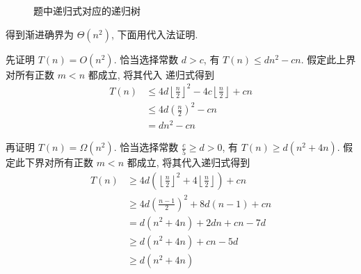 \documentclass[boxes]{homework}
\begin{document}
\begin{solution}
\begin{figure}[ht]
        \caption{题中递归式对应的递归树}
        \label{fig:recursion-tree-4.4-7}
    \end{figure}
    得到渐进确界为 $\Theta \left( n^{2}\right)$, 下面用代入法证明.

    先证明 $T(n) = O \left( n^{2}\right)$. 恰当选择常数 $d > c$, 有
    $T(n) \leqslant dn^{2} - cn$. 假定此上界对所有正数 $m < n$ 都成立, 将其代入
    递归式得到
    \begin{equation}
        \begin{aligned}
            T(n)
             & \leqslant 4 d{\left\lfloor \frac{ n }{ 2 }\right\rfloor}^{2} -
            4c \left\lfloor \frac{ n }{ 2 }\right\rfloor + cn                 \\
             & \leqslant 4 d{\left( \frac{ n }{ 2 }\right)}^{2} - cn          \\
             & = dn^{2} - cn
        \end{aligned}
    \end{equation}

    再证明 $T(n) = \Omega \left( n^{2}\right)$. 恰当选择常数
    $\frac{ c }{ 5 } \geqslant d > 0$, 有
    $T(n) \geqslant d \left( n^{2} + 4n\right)$. 假定此下界对所有正数 $m < n$
    都成立, 将其代入递归式得到
    \begin{equation}
        \begin{aligned}
            T(n)
             & \geqslant 4d \left(
            {\left\lfloor \frac{ n }{ 2 }\right\rfloor}^{2} +
            4 \left\lfloor \frac{ n }{ 2 }\right\rfloor \right) + cn  \\
             & \geqslant 4d {\left( \frac{ n - 1 }{ 2 }\right)}^{2} +
            8d(n - 1) + cn                                            \\
             & = d \left( n^{2} +4n\right) + 2dn + cn - 7d            \\
             & \geqslant d \left( n^{2} +4n\right) + cn - 5d          \\
             & \geqslant d \left( n^{2} + 4n\right)
        \end{aligned}
    \end{equation}
\end{solution}
\end{document}
